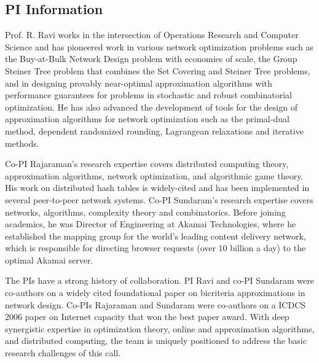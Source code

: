 \subsection{PI Information}
Prof. R. Ravi works in the intersection of Operations Research and
Computer Science and has pioneered work in various network
optimization problems such as the Buy-at-Bulk Network Design problem
with economies of scale, the Group Steiner Tree problem that combines
the Set Covering and Steiner Tree problems, and in designing provably
near-optimal approximation algorithms with performance guarantees for
problems in stochastic and robust combinatorial optimization. He has
also advanced the development of tools for the design of approximation
algorithms for network optimization such as the primal-dual method,
dependent randomized rounding, Lagrangean relaxations and iterative
methods.

Co-PI Rajaraman's research expertise covers distributed computing
theory, approximation algorithms, network optimization, and
algorithmic game theory.  His work on distributed hash tables is
widely-cited and has been implemented in several peer-to-peer network
systems.  Co-PI Sundaram's research expertise covers networks,
algorithms, complexity theory and combinatorics.  Before joining
academics, he was Director of Engineering at Akamai Technologies,
where he established the mapping group for the world's leading content
delivery network, which is responsible for directing browser requests
(over 10 billion a day) to the optimal Akamai server.

The PIs have a strong history of collaboration.  PI Ravi and co-PI
Sundaram were co-authors on a widely cited foundational paper on
bicriteria approximations in network design.  Co-PIs Rajaraman and
Sundaram were co-authors on a ICDCS 2006 paper on Internet capacity
that won the best paper award.  With deep synergistic expertise in
optimization theory, online and approximation algorithms, and
distributed computing, the team is uniquely positioned to address the
basic research challenges of this call.

